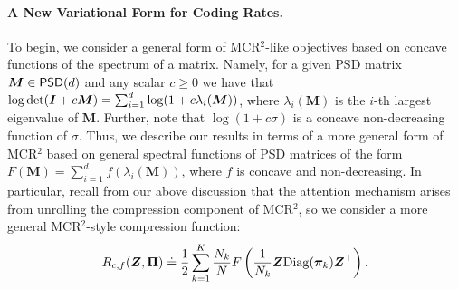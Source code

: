 \documentclass[\toplevelprefix/book-main.tex]{subfiles}
\begin{document}
 

\paragraph{A New Variational Form for Coding Rates.} To begin, we consider a general form of MCR$^2$-like objectives based on concave functions of the spectrum of a matrix.  Namely, for a given PSD matrix $\bm M \in \mathsf{PSD}(d)$ and any scalar $c \geq 0$ we have that $\log \det (\bm{I} + c \bm M) = \sum_{i=1}^{d} \log( 1 + c \lambda_i(\bm M))$, where $\lambda_i (\bm M)$ is the $i$-th largest eigenvalue of $\bm M$.  Further, note that $\log(1 + c \sigma)$ is a concave non-decreasing function of $\sigma$.  Thus, we describe our results in terms of a more general form of MCR$^2$ based on general spectral functions of PSD matrices of the form $F(\bm M) = \sum_{i=1}^{d} f(\lambda_i(\bm M))$, where $f$ is concave and non-decreasing.  In particular, recall from our above discussion that the attention mechanism arises from unrolling the compression component of MCR$^2$, so we consider a more general MCR$^2$-style compression function:
\vspace{-2mm}
\begin{equation}
    R_{c,f}(\bm Z, \bm \Pi) \doteq \frac{1}{2}\sum_{k=1}^K \frac{N_k}{N} F\left( \frac{1}{N_k}\bm{Z} \mathrm{Diag}(\bm \pi_k) \bm{Z}^{\top} \right).
    \label{eq:mcr_c_gen}
\end{equation}
\end{document}
